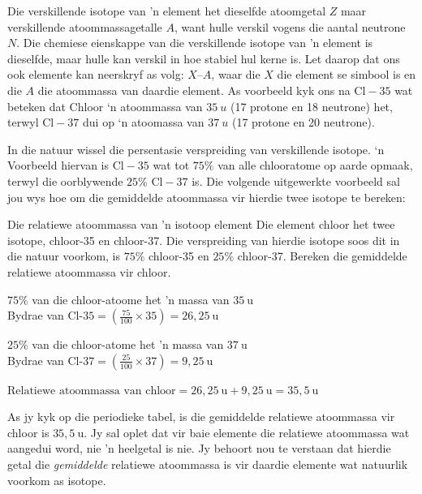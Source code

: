 \label{m38753*id257405}
Die verskillende isotope van 'n element het dieselfde atoomgetal $Z$ maar verskillende atoommassagetalle $A$, want hulle verskil vogens die aantal neutrone $N$. Die chemiese eienskappe van die verskillende isotope van 'n element is dieselfde, maar hulle kan verskil in hoe stabiel hul kerne is. Let daarop dat ons ook elemente kan neerskryf as volg: $X – A$, waar die $X$ die element se simbool is en die $A$ die atoommassa van daardie element. As voorbeeld kyk ons na $\text{Cl}-35$ wat beteken dat Chloor ‘n atoommassa van $35 ~u$ (17 protone en 18 neutrone) het, terwyl $\text{Cl}-37$ dui op ‘n atoomassa van $37 ~u$ (17 protone en 20 neutrone).  \par 
\label{m38753*notfhsst!!!underscore!!!id393}
\label{m38753*id248557}
In die natuur wissel die persentasie verspreiding van verskillende isotope. ‘n Voorbeeld hiervan is $\text{Cl}-35$ wat tot $75\%$ van alle chlooratome op aarde opmaak, terwyl die oorblywende $25\%$ $\text{Cl}-37$ is. Die volgende uitgewerkte voorbeeld sal jou wys
hoe om die gemiddelde atoommassa vir hierdie twee isotope te bereken: \par  
\begin{wex}{Die relatiewe atoommassa van 'n isotoop element}{
Die element chloor het twee isotope, chloor-35 en chloor-37. Die verspreiding van hierdie isotope soos dit in die natuur voorkom, is $75\%$ chloor-35 en $25\%$ chloor-37. Bereken die gemiddelde relatiewe atoommassa vir chloor.
}
{
$75\%$ van die chloor-atoome het 'n massa van $35~\text{u}$ \\
Bydrae van $\text{Cl-}35 = (\frac{75}{100} \times 35) = 26,25~\text{u}$

$25\%$ van die chloor-atome het 'n massa van $37~\text{u}$ \\ 
Bydrae van $\text{Cl-}37 = (\frac{25}{100} \times 37) = 9,25~\text{u}$


$\text{Relatiewe atoommassa van chloor} = 26,25~\text{u} + 9,25~\text{u} = 35,5~\text{u}$ \\
}
\end{wex}
As jy kyk op die periodieke tabel, is die gemiddelde relatiewe atoommassa vir chloor is $35,5~\text{u}$. Jy sal oplet dat vir baie elemente die relatiewe atoommassa wat aangedui word, nie 'n heelgetal is nie. Jy behoort nou te verstaan ​dat hierdie getal die \textsl{gemiddelde} relatiewe atoommassa is vir daardie elemente wat natuurlik voorkom as isotope.\par

